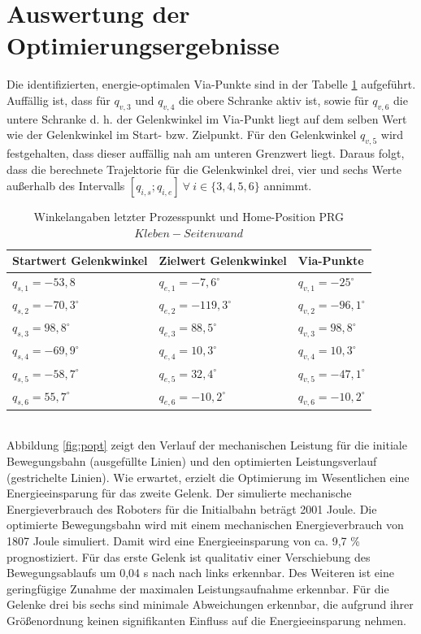 \section{Auswertung der Optimierungsergebnisse}
Die identifizierten, energie-optimalen Via-Punkte sind in der Tabelle \ref{tab:optviapunkte} aufgeführt. Auffällig ist, dass für $q_{v,3}$ und $q_{v,4}$ die obere Schranke aktiv ist, sowie für $q_{v,6}$ die untere Schranke d. h. der Gelenkwinkel im Via-Punkt liegt auf dem selben Wert wie der Gelenkwinkel im Start- bzw. Zielpunkt. Für den Gelenkwinkel $q_{v,5}$ wird festgehalten, dass dieser auffällig nah am unteren Grenzwert liegt. Daraus folgt, dass die berechnete Trajektorie für die Gelenkwinkel drei, vier und sechs Werte außerhalb des Intervalls $[q_{i,s};q_{i,e}] ~\forall~ i \in \{3,4,5,6\}$ annimmt. 
\\
\begin{table}[tbph]
	\centering
	\caption{Winkelangaben letzter Prozesspunkt und Home-Position PRG $Kleben-Seitenwand$}
	\label{tab:optviapunkte}
	\begin{tabular}{|l|l|l|}
		\hline
		Startwert Gelenkwinkel&  Zielwert Gelenkwinkel&  Via-Punkte\\
		\hline
		$q_{s,1} = -53,8$			&  $q_{e,1} = -7,6^{\circ}$  		&$q_{v,1} = -25^{\circ}$  \\
		\hline
		$q_{s,2} = -70,3^{\circ}$	&  $q_{e,2} = -119,3^{\circ}$    	&$q_{v,2} = -96,1^{\circ}$  \\
		\hline
		$q_{s,3} = 98,8^{\circ}$	&  $q_{e,3} = 88,5^{\circ}$ 		&$q_{v,3} = 98,8^{\circ}$  \\
		\hline
		$q_{s,4} = -69,9^{\circ}$	&  $q_{e,4} = 10,3^{\circ}$ 		&$q_{v,4} = 10,3^{\circ}$  \\
		\hline
		$q_{s,5} = -58,7^{\circ}$	&  $q_{e,5} = 32,4^{\circ}$  		&$q_{v,5} = -47,1^{\circ}$  \\
		\hline
		$q_{s,6} = 55,7^{\circ}$	&  $q_{e,6} = -10,2^{\circ}$ 		&$q_{v,6} = -10,2^{\circ}$  \\
		\hline
	\end{tabular}
\end{table}
\\
Abbildung \ref{fig:popt} zeigt den Verlauf der mechanischen Leistung für die initiale Bewegungsbahn (ausgefüllte Linien) und den optimierten Leistungsverlauf (gestrichelte Linien). Wie erwartet, erzielt die Optimierung im Wesentlichen eine Energieeinsparung für das zweite Gelenk. Der simulierte mechanische Energieverbrauch des Roboters für die Initialbahn beträgt 2001 Joule. Die optimierte Bewegungsbahn wird mit einem mechanischen Energieverbrauch von 1807 Joule simuliert. Damit wird eine Energieeinsparung von ca. 9,7 \% prognostiziert. Für das erste Gelenk ist qualitativ einer Verschiebung des Bewegungsablaufs um 0,04 s nach nach links erkennbar. Des Weiteren ist eine geringfügige Zunahme der maximalen Leistungsaufnahme erkennbar. Für die Gelenke drei bis sechs sind minimale Abweichungen erkennbar, die aufgrund ihrer Größenordnung keinen signifikanten Einfluss auf die Energieeinsparung nehmen. 
